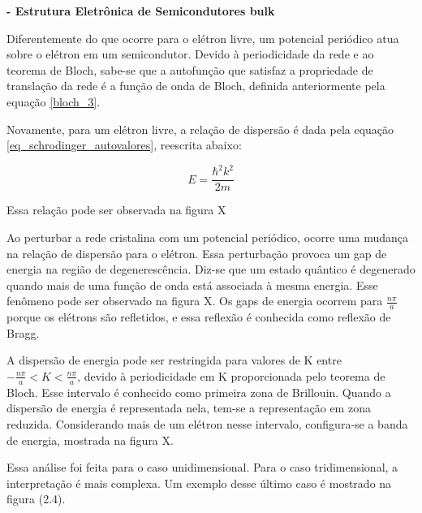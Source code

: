 	\par \textbf{- Estrutura Eletrônica de Semicondutores bulk}

		\par Diferentemente do que ocorre para o elétron livre, um potencial periódico atua sobre o elétron em um semicondutor. Devido à periodicidade da rede e ao teorema de Bloch, sabe-se que a autofunção que satisfaz a propriedade de translação da rede é a função de onda de Bloch, definida anteriormente pela equação \eqref{bloch_3}.

		\par Novamente, para um elétron livre, a relação de dispersão é dada pela equação \eqref{eq_schrodinger_autovalores}, reescrita abaixo:

		\begin{equation}\label{eq_schrodinger_autovalores_rewrote}
	        E = \frac{\hbar^2 k^2}{2m}
	  	\end{equation}

	  	\par Essa relação pode ser observada na figura X


	  	\par Ao perturbar a rede cristalina com um potencial periódico, ocorre uma mudança na relação de dispersão para o elétron. Essa perturbação provoca um gap de energia na região de degenerescência. Diz-se que um estado quântico é degenerado quando mais de uma função de onda está associada à mesma energia. Esse fenômeno pode ser observado na figura X. Os gaps de energia ocorrem para $\frac{n\pi}{a}$ porque os elétrons são refletidos, e essa reflexão é conhecida como reflexão de Bragg.

	  	\par A dispersão de energia pode ser restringida para valores de K entre $-\frac{n\pi}{a} < K < \frac{n\pi}{a}$, devido à periodicidade em K proporcionada pelo teorema de Bloch. Esse intervalo é conhecido como primeira zona de Brillouin. Quando a dispersão de energia é representada nela, tem-se a representação em zona reduzida. Considerando mais de um elétron nesse intervalo, configura-se a banda de energia, mostrada na figura X.

		\par Essa análise foi feita para o caso unidimensional. Para o caso tridimensional, a interpretação é mais complexa. Um exemplo desse último caso é mostrado na  figura (2.4).


